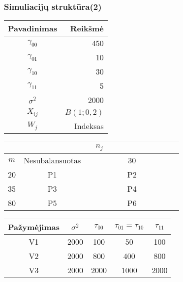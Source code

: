 \documentclass[utf8,hyperref={unicode,pdftex}]{beamer}
\begin{document}
\begin{frame}
\frametitle{Simuliacijų struktūra(2)}

\begin{table}[!htb]
\begin{small}


\begin{subtable}{.5\linewidth}
\begin{tabular}{|c|r|}
\hline
Pavadinimas & Reikšmė\\
\hline
$\gamma_{00}$& 450  \\
$\gamma_{01}$& 10  \\
$\gamma_{10}$& 30 \\
$\gamma_{11}$& 5  \\
$\sigma^2$& 2000  \\
$X_{ij}$ &  $B\left(1; 0,2\right)$ \\
$W_{j}$ &  Indeksas \\
\hline
\end{tabular}
\end{subtable}



\begin{subtable}{.5\linewidth}
\begin{tabular}{|c|cc|}
\hline
 & \multicolumn{2}{c|}{$n_j$}\\
\hline
$m$& Nesubalansuotas & \ \ \ \ \ \ \ \ \ \ 30\ \ \ \ \ \ \ \ \ \ \\
\hline
20& P1&P2\\
35&P3&P4\\
80& P5&P6\\
\hline
\end{tabular}

\begin{tabular}{|c|cccc|}
\hline
 Pažymėjimas & $\sigma^2$&$\tau_{00}$&$\tau_{01}=\tau_{10}$&$\tau_{11}$\\
\hline
V1&2000&100&50&100\\
V2&2000&800&400&800\\
V3&2000&2000&1000&2000\\
\hline

\hline
\end{tabular}
\end{subtable}
\end{small}
\end{table}

\end{frame}
\end{document}
